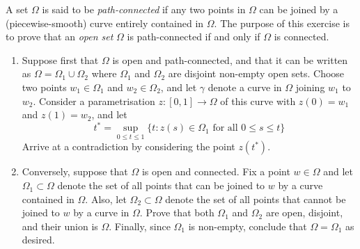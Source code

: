 \documentclass[12 pt, letterpaper]{hmcpset}
\begin{document}
\begin{problem}[5]
	A set $\Omega$ is said to be \emph{path-connected} if any two points in $\Omega$ can be joined by a (piecewise-smooth) curve entirely contained in $\Omega$. The purpose of this exercise is to prove that an \emph{open set} $\Omega$ is path-connected if and only if $\Omega$ is connected.
	\begin{enumerate}
		\item Suppose first that $\Omega$ is open and path-connected, and that it can be written as $\Omega = \Omega_{1} \cup \Omega_{2}$ where $\Omega_{1}$ and $\Omega_{2}$ are disjoint non-empty open sets. Choose two points $w_{1} \in \Omega_{1}$ and $w_{2} \in \Omega_{2}$, and let $\gamma$ denote a curve in $\Omega$ joining $w_{1}$ to $w_{2}$. Consider a parametrisation $z : [0, 1] \to \Omega$ of this curve with $z(0) = w_{1}$ and $z(1) = w_{2}$, and let
			\[
				t^{*} = \sup_{0 \le t \le 1} \{ t  : z(s) \in \Omega_{1} \text{ for all }0 \le s \le t \}
			\]
			Arrive at a contradiction by considering the point $z(t^{*})$.
		\item Conversely, suppose that $\Omega$ is open and connected. Fix a point $w \in \Omega$ and let $\Omega_{1} \subset \Omega$ denote the set of all points that can be joined to $w$ by a curve contained in $\Omega$. Also, let $\Omega_{2} \subset \Omega$ denote the set of all points that cannot be joined to $w$ by a curve in $\Omega$. Prove that both  $\Omega_{1}$ and $\Omega_{2}$ are open, disjoint, and their union is $\Omega$. Finally, since $\Omega_{1}$ is non-empty, conclude that $\Omega = \Omega_{1}$ as desired.
	\end{enumerate}
\end{problem}
\end{document}
